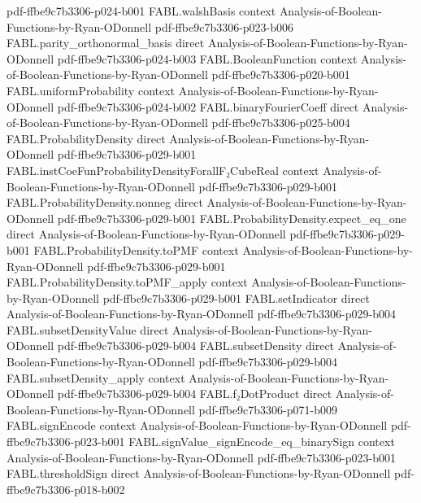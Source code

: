 \begin{theorem}
  {pdf-ffbe9c7b3306-p024-b001}
\proofstep
  {FABL.walshBasis}
  {context}
  {Analysis-of-Boolean-Functions-by-Ryan-ODonnell}
  {pdf-ffbe9c7b3306-p023-b006}
\proofstep
  {FABL.parity_orthonormal_basis}
  {direct}
  {Analysis-of-Boolean-Functions-by-Ryan-ODonnell}
  {pdf-ffbe9c7b3306-p024-b003}
\proofstep
  {FABL.BooleanFunction}
  {context}
  {Analysis-of-Boolean-Functions-by-Ryan-ODonnell}
  {pdf-ffbe9c7b3306-p020-b001}
\proofstep
  {FABL.uniformProbability}
  {context}
  {Analysis-of-Boolean-Functions-by-Ryan-ODonnell}
  {pdf-ffbe9c7b3306-p024-b002}
\proofstep
  {FABL.binaryFourierCoeff}
  {direct}
  {Analysis-of-Boolean-Functions-by-Ryan-ODonnell}
  {pdf-ffbe9c7b3306-p025-b004}
\proofstep
  {FABL.ProbabilityDensity}
  {direct}
  {Analysis-of-Boolean-Functions-by-Ryan-ODonnell}
  {pdf-ffbe9c7b3306-p029-b001}
\proofstep
  {FABL.instCoeFunProbabilityDensityForallF₂CubeReal}
  {context}
  {Analysis-of-Boolean-Functions-by-Ryan-ODonnell}
  {pdf-ffbe9c7b3306-p029-b001}
\proofstep
  {FABL.ProbabilityDensity.nonneg}
  {direct}
  {Analysis-of-Boolean-Functions-by-Ryan-ODonnell}
  {pdf-ffbe9c7b3306-p029-b001}
\proofstep
  {FABL.ProbabilityDensity.expect_eq_one}
  {direct}
  {Analysis-of-Boolean-Functions-by-Ryan-ODonnell}
  {pdf-ffbe9c7b3306-p029-b001}
\proofstep
  {FABL.ProbabilityDensity.toPMF}
  {context}
  {Analysis-of-Boolean-Functions-by-Ryan-ODonnell}
  {pdf-ffbe9c7b3306-p029-b001}
\proofstep
  {FABL.ProbabilityDensity.toPMF_apply}
  {context}
  {Analysis-of-Boolean-Functions-by-Ryan-ODonnell}
  {pdf-ffbe9c7b3306-p029-b001}
\proofstep
  {FABL.setIndicator}
  {direct}
  {Analysis-of-Boolean-Functions-by-Ryan-ODonnell}
  {pdf-ffbe9c7b3306-p029-b004}
\proofstep
  {FABL.subsetDensityValue}
  {direct}
  {Analysis-of-Boolean-Functions-by-Ryan-ODonnell}
  {pdf-ffbe9c7b3306-p029-b004}
\proofstep
  {FABL.subsetDensity}
  {direct}
  {Analysis-of-Boolean-Functions-by-Ryan-ODonnell}
  {pdf-ffbe9c7b3306-p029-b004}
\proofstep
  {FABL.subsetDensity_apply}
  {context}
  {Analysis-of-Boolean-Functions-by-Ryan-ODonnell}
  {pdf-ffbe9c7b3306-p029-b004}
\proofstep
  {FABL.f₂DotProduct}
  {direct}
  {Analysis-of-Boolean-Functions-by-Ryan-ODonnell}
  {pdf-ffbe9c7b3306-p071-b009}
\proofstep
  {FABL.signEncode}
  {context}
  {Analysis-of-Boolean-Functions-by-Ryan-ODonnell}
  {pdf-ffbe9c7b3306-p023-b001}
\proofstep
  {FABL.signValue_signEncode_eq_binarySign}
  {context}
  {Analysis-of-Boolean-Functions-by-Ryan-ODonnell}
  {pdf-ffbe9c7b3306-p023-b001}
\proofstep
  {FABL.thresholdSign}
  {direct}
  {Analysis-of-Boolean-Functions-by-Ryan-ODonnell}
  {pdf-ffbe9c7b3306-p018-b002}
\proofstep

\end{theorem}
